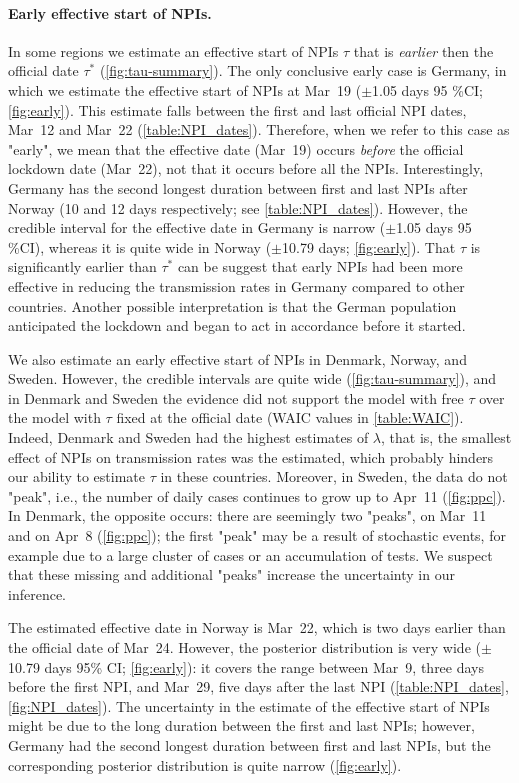 \documentclass[12pt]{extarticle}
\begin{document}
\paragraph*{Early effective start of NPIs.}
In some regions we estimate an effective start of NPIs $\tau$ that is \emph{earlier} then the official date $\tau^*$ (\autoref{fig:tau-summary}).
The only conclusive early case is Germany, in which we estimate the effective start of NPIs at Mar~19 ($\pm$1.05 days 95 \%CI; \autoref{fig:early}).
This estimate falls between the first and last official NPI dates, Mar~12 and Mar~22 (\autoref{table:NPI_dates}). Therefore, when we refer to this case as "early", we mean that the effective date (Mar~19) occurs \emph{before} the official lockdown date (Mar~22), not that it occurs before all the NPIs.
Interestingly, Germany has the second longest duration between first and last NPIs after Norway (10 and 12 days respectively; see \autoref{table:NPI_dates}).
However, the credible interval for the effective date in Germany is narrow ($\pm$1.05 days 95 \%CI), whereas it is quite wide in Norway ($\pm$10.79 days; \autoref{fig:early}).
That $\tau$ is significantly earlier than $\tau^*$ can be suggest that early NPIs had been more effective in reducing the transmission rates in Germany compared to other countries. Another possible interpretation is that the German population anticipated the lockdown and began to act in accordance before it started.

We also estimate an early effective start of NPIs in Denmark, Norway, and Sweden.
However, the credible intervals are quite wide (\autoref{fig:tau-summary}), and in Denmark and Sweden the evidence did not support the model with free $\tau$ over the model with $\tau$ fixed at the official date (WAIC values in \autoref{table:WAIC}). Indeed, Denmark and Sweden had the highest estimates of $\lambda$, that is, the  smallest effect of NPIs on transmission rates was the estimated, which  probably hinders our ability to estimate $\tau$ in these countries.
Moreover, in Sweden, the data do not "peak", i.e., the number of daily cases continues to grow up to Apr~11 (\autoref{fig:ppc}). 
In Denmark, the opposite occurs: there are seemingly two "peaks", on Mar~11 and on Apr~8 (\autoref{fig:ppc}); the first "peak" may be a result of stochastic events, for example due to a large cluster of cases or an accumulation of tests.
We suspect that these missing and additional "peaks" increase the uncertainty in our inference.

The estimated effective date in Norway is Mar~22, which is two days earlier than the official date of Mar~24.
However, the posterior distribution is very wide ($\pm$10.79 days 95\% CI; \autoref{fig:early}): it covers the range between Mar~9, three days before the first NPI, and Mar~29, five days  after the last NPI (\autoref{table:NPI_dates}, \autoref{fig:NPI_dates}).
The uncertainty in the estimate of the effective start of NPIs might be due to the long duration between the first and last NPIs; however, Germany had the second longest duration between first and last NPIs, but the corresponding posterior distribution is quite narrow (\autoref{fig:early}).
\end{document}
